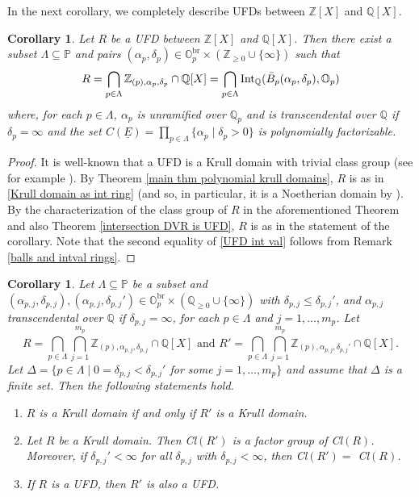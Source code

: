 \documentclass[10pt]{article}
\numberwithin{equation}{section}
\newtheorem{Cor}[equation]{Corollary}
\theoremstyle{definition}
\theoremstyle{definition}
\newcommand{\Q}{\mathbb{Q}}
\newcommand{\Z}{\mathbb{Z}}
\renewcommand{\O}{\mathbb{O}}
\newcommand{\PP}{\mathbb{P}}
\newcommand{\Int}{\textnormal{Int}}
\newcommand{\IntQ}{\Int_{\Q}}
\newcommand{\uE}{\underline{E}}
\newcommand{\br}{\text{br}}
\begin{document}
In the next corollary, we completely describe UFDs between $\Z[X]$ and $\Q[X]$.
\begin{Cor}\label{global UFD}
Let $R$ be a UFD between $\Z[X]$ and $\Q[X]$. Then there exist a subset 
$\Lambda\subseteq\PP$ and pairs $(\alpha_p,\delta_p)\in\O_p^{\br}\times(\Z_{\geq0}\cup\{\infty\})$ such that 
\begin{equation}\label{UFD int val}
R=\bigcap_{p\in\Lambda}\Z_{(p),\alpha_p,\delta_p}\cap\Q[X]=\bigcap_{p\in\Lambda}\IntQ(\bar B_p(\alpha_p,\delta_p),\O_p)
\end{equation}
where, for each $p\in\Lambda$, $\alpha_p$ is unramified over $\Q_p$ and is  transcendental over 
$\Q$ if $\delta_p=\infty$ and the set  
$C(\uE)=\prod\limits_{p\in\Lambda}\{\alpha_{p} \mid \delta_{p}>0\}$ is
polynomially factorizable.
\end{Cor}
\begin{proof}
It is well-known that a UFD is a Krull domain with trivial class group (see for example \cite[Proposition 6.1]{Fossum}). By Theorem \ref{main thm polynomial krull domains}, $R$ is as in \eqref{Krull domain as int ring} (and so, in particular, it is a Noetherian domain by \cite{Heinzer}). By the characterization of the class group of $R$ in the aforementioned Theorem and also Theorem \ref{intersection DVR is UFD}, $R$ is as in the statement of the corollary. Note that the second equality of \eqref{UFD int val} follows from Remark \ref{balls and intval rings}.
\end{proof}


\begin{Cor}\label{coro433}
Let $\Lambda\subseteq\PP$ be a subset and  $(\alpha_{p,j},\delta_{p,j}), (\alpha_{p,j},\delta_{p,j}') \in\O_p^{\br}\times(\Q_{\geq0}\cup\{\infty\})$ 
with $\delta_{p,j} \leq \delta_{p,j}'$, and $\alpha_{p,j}$ transcendental over $\Q$ if $\delta_{p,j}=\infty$, 
for each $p\in\Lambda$ and $j=1,\ldots,m_p$. Let 
$$R = \bigcap_{p\in\Lambda}\bigcap_{j=1}^{m_p}\Z_{(p),\alpha_{p,j},\delta_{p,j}}\cap\Q[X] \text{ and }
R' = \bigcap_{p\in\Lambda}\bigcap_{j=1}^{m_p}\Z_{(p),\alpha_{p,j},\delta_{p,j}'}\cap\Q[X].$$
Let $\Delta = \{p \in \Lambda \mid 0 = \delta_{p, j} < \delta_{p,j}'$ for some $j=1, \dots, m_p\}$ and assume that $\Delta$ is a finite set. Then the following statements hold.
\begin{enumerate}
\item[\em (1)]  $R$ is a Krull domain if and only if $R'$ is a Krull domain. %
\item[\em (2)] Let $R$ be a Krull domain. Then Cl$(R')$ is a factor group of Cl$(R)$. Moreover, if $\delta_{p,j}' < \infty$ for all $\delta_{p,j}$
with $\delta_{p,j} < \infty$, then Cl$(R') =$ Cl$(R)$.
\item[\em (3)] If $R$ is a UFD, then $R'$ is also a UFD.
\end{enumerate}
\end{Cor}
\end{document}
